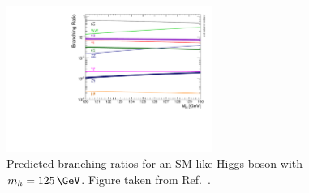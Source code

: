 \begin{figure}[!htb]
    \begin{center}
        \includegraphics[width=0.6\textwidth]{figures/chapter1/sm_final/higgs_br_sm}
        \caption{
            Predicted branching ratios for an SM-like Higgs boson with $m_{h} = 125\,\GeV$.
            Figure taken from Ref.~\cite{deFlorian:2016spz}.
        }
        \label{fig:higgs_br_sm}
    \end{center}
\end{figure}

